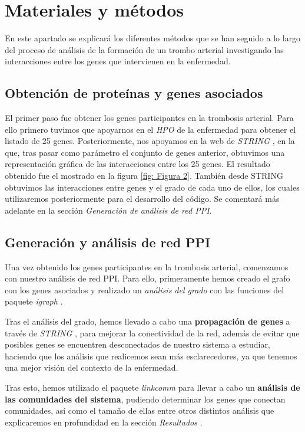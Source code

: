 \section{Materiales y métodos}

En este apartado se explicará los diferentes métodos que se han seguido a lo largo del proceso de análisis de la formación de un trombo arterial investigando las interacciones entre los genes que intervienen en la enfermedad.

\subsection{Obtención de proteínas y genes asociados}

El primer paso fue obtener los genes participantes en la trombosis arterial. Para ello primero tuvimos que apoyarnos en el \textit{HPO} de la enfermedad \cite{HPO} para obtener el listado de 25 genes. Posteriormente, nos apoyamos en la web de \textit{STRING} \cite{STRING} , en la que, tras pasar como parámetro el conjunto de genes anterior, obtuvimos una representación gráfica de las interacciones entre los 25 genes. El resultado obtenido fue el mostrado en la figura \ref{fig: Figura 2}. También desde STRING obtuvimos las interacciones entre genes y el grado de cada uno de ellos, los cuales utilizaremos posteriormente para el desarrollo del código. Se comentará más adelante en la sección \textit{Generación de análisis de red PPI}. \\



\subsection{Generación y análisis de red PPI}
Una vez obtenido los genes participantes en la trombosis arterial, comenzamos con nuestro análisis de red PPI. Para ello, primeramente hemos creado el grafo con los genes asociados y realizado un \textit{análisis del grado} con las funciones del paquete \textit{igraph} \cite{igraph}. 

Tras el análisis del grado, hemos llevado a cabo una \textbf{propagación de genes} a través de \textit{STRING} \cite{STRING}, para mejorar la conectividad de la red, además de evitar que posibles genes se encuentren desconectados de nuestro sistema a estudiar, haciendo que los análisis que realicemos sean más esclarecedores, ya que tenemos una mejor visión del contexto de la enfermedad. 

Tras esto, hemos utilizado el paquete \textit{linkcomm} \cite{linkcomm} para llevar a cabo un \textbf{análisis de las comunidades del sistema}, pudiendo determinar los genes que conectan comunidades, así como el tamaño de ellas entre otros distintos análisis que explicaremos en profundidad en la sección \textit{Resultados} .

